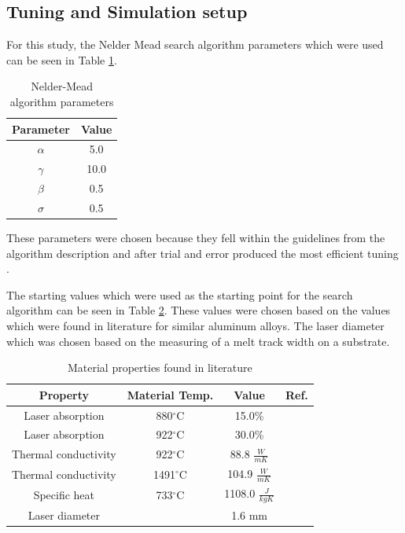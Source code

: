 \documentclass[pdflatex,sn-mathphys]{sn-jnl}
\newcommand{\degree}{$^\circ$}
\begin{document}
	\subsection{Tuning and Simulation setup} \label{sim_setup}

	For this study, the Nelder Mead search algorithm parameters which were used can be seen in Table \ref{tab:nm_parameters}.
	\begin{table}[!htb]
		\centering
		\caption{Nelder-Mead algorithm parameters}
		\label{tab:nm_parameters}
			\begin{tabular}{|c|c|} \hline 
				Parameter & Value \\ \hline
				$\alpha$ & 5.0 \\ \hline
				$\gamma$ & 10.0 \\ \hline
				$\beta$ & 0.5 \\ \hline
				$\sigma$ & 0.5 \\ \hline
			\end{tabular}
	\end{table}
	These parameters were chosen because they fell within the guidelines from the algorithm description and after trial and error produced the most efficient tuning \cite{nelder_1965}.
	
	The starting values which were used as the starting point for the search algorithm can be seen in Table \ref{tab:starting_mat_prop_complete}.  These values were chosen based on the values which were found in literature for similar aluminum alloys.  The laser diameter which was chosen based on the measuring of a melt track width on a substrate. 
	\begin{table}[!htb]
		\centering
		\caption{Material properties found in literature}
		\label{tab:starting_mat_prop_complete}
			\begin{tabular}{|c|c|c|c|} \hline 
				Property & Material Temp. & Value & Ref. \\ \hline
				Laser absorption & 880\degree C & 15.0\% & \cite{boyden_temperature_2006} \\ \hline
				Laser absorption & 922\degree C & 30.0\% & \cite{boyden_temperature_2006} \\ \hline
				Thermal conductivity & 922\degree C & 88.8 $\frac{W}{mK}$ & \cite{leitner_thermophysical_2017}\\ \hline
				Thermal conductivity & 1491\degree C & 104.9 $\frac{W}{mK}$ & \cite{leitner_thermophysical_2017}\\ \hline
				Specific heat & 733\degree C & 1108.0 $\frac{J}{kgK}$ & \cite{leitner_thermophysical_2017}\\ \hline
				Laser diameter & & 1.6 mm & \\ \hline
			\end{tabular}
	\end{table}
	
\end{document}
